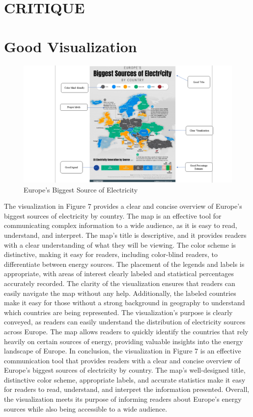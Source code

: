\documentclass[
]{article}
\begin{document}
\newpage

\hypertarget{critique}{%
\section{CRITIQUE}\label{critique}}

\hypertarget{good-visualization}{%
\section{Good Visualization}\label{good-visualization}}

\begin{figure}
\includegraphics[width=1\linewidth]{../Images/Good Vis} \caption{Europe's Biggest Source of Electricity}\label{fig:Good Visualization}
\end{figure}

The visualization in Figure 7 provides a clear and concise overview of
Europe's biggest sources of electricity by country. The map is an
effective tool for communicating complex information to a wide audience,
as it is easy to read, understand, and interpret. The map's title is
descriptive, and it provides readers with a clear understanding of what
they will be viewing. The color scheme is distinctive, making it easy
for readers, including color-blind readers, to differentiate between
energy sources. The placement of the legends and labels is appropriate,
with areas of interest clearly labeled and statistical percentages
accurately recorded. The clarity of the visualization ensures that
readers can easily navigate the map without any help. Additionally, the
labeled countries make it easy for those without a strong background in
geography to understand which countries are being represented. The
visualization's purpose is clearly conveyed, as readers can easily
understand the distribution of electricity sources across Europe. The
map allows readers to quickly identify the countries that rely heavily
on certain sources of energy, providing valuable insights into the
energy landscape of Europe. In conclusion, the visualization in Figure 7
is an effective communication tool that provides readers with a clear
and concise overview of Europe's biggest sources of electricity by
country. The map's well-designed title, distinctive color scheme,
appropriate labels, and accurate statistics make it easy for readers to
read, understand, and interpret the information presented. Overall, the
visualization meets its purpose of informing readers about Europe's
energy sources while also being accessible to a wide audience.
\end{document}
